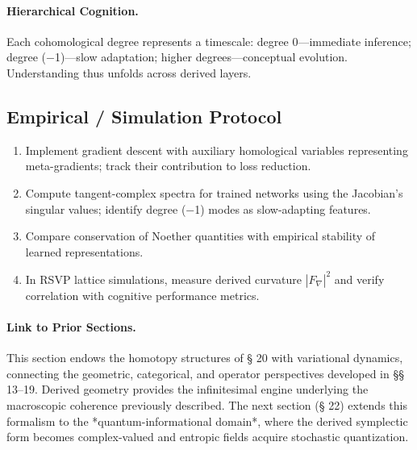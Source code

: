 \documentclass[12pt,a4paper,twoside,openright]{book}
\begin{document}
\paragraph{Hierarchical Cognition.}
Each cohomological degree represents a timescale:  
degree 0—immediate inference; degree (−1)—slow adaptation; higher degrees—conceptual evolution.  
Understanding thus unfolds across derived layers.

\subsection*{Empirical / Simulation Protocol}

\begin{enumerate}
\item Implement gradient descent with auxiliary homological variables representing meta-gradients; track their contribution to loss reduction.
\item Compute tangent-complex spectra for trained networks using the Jacobian’s singular values; identify degree (−1) modes as slow-adapting features.
\item Compare conservation of Noether quantities with empirical stability of learned representations.
\item In RSVP lattice simulations, measure derived curvature $|F_\nabla|^2$ and verify correlation with cognitive performance metrics.
\end{enumerate}

\paragraph{Link to Prior Sections.}
This section endows the homotopy structures of § 20 with variational dynamics, connecting the geometric, categorical, and operator perspectives developed in §§ 13–19.  
Derived geometry provides the infinitesimal engine underlying the macroscopic coherence previously described.  
The next section (§ 22) extends this formalism to the *quantum-informational domain*, where the derived symplectic form becomes complex-valued and entropic fields acquire stochastic quantization.

\end{document}
